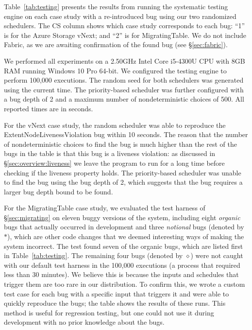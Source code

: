 Table~\ref{tab:testing} presents the results from running the \psharp systematic testing engine on each case study with a re-introduced bug using our two randomized schedulers. The CS column shows which case study corresponds to each bug: ``1'' is for the Azure Storage vNext; and ``2'' is for MigratingTable. We do not include Fabric, as we are awaiting confirmation of the found bug (see \S\ref{sec:fabric}).

We performed all experiments on a 2.50GHz Intel Core i5-4300U CPU with 8GB RAM running Windows 10 Pro 64-bit. We configured the \psharp testing engine to perform 100,000 executions. The random seed for both schedulers was generated using the current time. The priority-based scheduler was further configured with a bug depth of 2 and a maximum number of nondeterministic choices of 500. All reported times are in seconds.

For the vNext case study, the random scheduler was able to reproduce the ExtentNodeLivenessViolation bug within 10 seconds. The reason that the number of nondeterministic choices to find the bug is much higher than the rest of the bugs in the table is that this bug is a liveness violation: as discussed in \S\ref{sec:overview:liveness} we leave the program to run for a long time before checking if the liveness property holds. The priority-based scheduler was unable to find the bug using the bug depth of 2, which suggests that the bug requires a larger bug depth bound to be found.

For the MigratingTable case study, we evaluated the \psharp test harness of \S\ref{sec:migrating} on eleven buggy versions of the system, including eight \emph{organic} bugs that actually occurred in development and three \emph{notional} bugs (denoted by $*$), which are other code changes that we deemed interesting ways of making the system incorrect. The test found seven of the organic bugs, which are listed first in Table~\ref{tab:testing}. The remaining four bugs (denoted by $\diamond$) were not caught with our default test harness in the 100,000 executions (a process that required less than 30 minutes). We believe this is because the inputs and schedules that trigger them are too rare in our distribution. To confirm this, we wrote a custom test case for each bug with a specific input that triggers it and were able to quickly reproduce the bugs;
the table shows the results of these runs.
This method is useful for regression testing, but one could not use it during development with no prior knowledge about the bugs.

